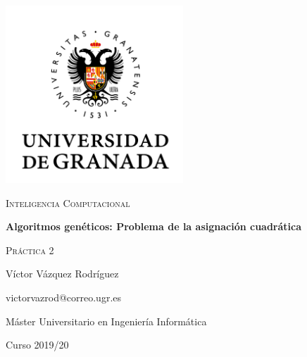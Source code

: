 \documentclass{article}
\begin{document}
\begin{titlepage}
    \centering
    \includegraphics[width=0.5\textwidth]{images/logo-ugr.png}\par
    \vspace{1cm}
    {\Large\scshape Inteligencia Computacional \par}
    {\huge\bfseries Algoritmos genéticos: Problema de la asignación cuadrática
    \par}
    \vspace{0.2cm}
    {\scshape Práctica 2 \par}
    \vfill
    {\large Víctor Vázquez Rodríguez  \par}
    {victorvazrod@correo.ugr.es \par}
    \vfill
    {\large Máster Universitario en Ingeniería Informática \par}
    \vspace{0.2cm}
    {Curso 2019/20 \par}
\end{titlepage}

\tableofcontents\newpage

\newpage
\newpage
\newpage
\newpage
\end{document}
